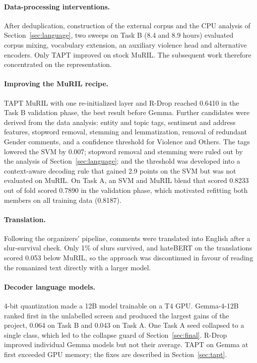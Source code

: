 \documentclass[11pt]{article}
\newcommand{\taska}{Task A}
\newcommand{\taskb}{Task B}
\begin{document}
\paragraph{Data-processing interventions.} After deduplication, construction of
the external corpus and the CPU analysis of Section~\ref{sec:language}, two
sweeps on \taskb{} (8.4 and 8.9 hours) evaluated corpus mixing, vocabulary
extension, an auxiliary violence head and alternative encoders. Only TAPT
improved on stock MuRIL. The subsequent work therefore concentrated on the
representation.

\paragraph{Improving the MuRIL recipe.} TAPT MuRIL with one re-initialized layer
and R-Drop reached 0.6410 in the \taskb{} validation phase, the best result
before Gemma. Further candidates were derived from the data analysis: entity
and topic tags, sentiment and address features, stopword removal, stemming and
lemmatization, removal of redundant Gender comments, and a confidence threshold
for Violence and Others. The tags lowered the SVM by 0.007; stopword removal
and stemming were ruled out by the analysis of Section~\ref{sec:language}; and
the threshold was developed into a context-aware decoding rule that gained 2.9
points on the SVM but was not evaluated on MuRIL. On \taska{}, an SVM and MuRIL
blend that scored 0.8233 out of fold scored 0.7890 in the validation phase,
which motivated refitting both members on all training data (0.8187).

\paragraph{Translation.} Following the organizers' pipeline, comments were
translated into English after a slur-survival check. Only 1\% of slurs
survived, and hateBERT on the translations scored 0.053 below MuRIL, so the
approach was discontinued in favour of reading the romanized text directly with
a larger model.

\paragraph{Decoder language models.} 4-bit quantization made a 12B model
trainable on a T4 GPU. Gemma-4-12B ranked first in the unlabelled screen and
produced the largest gains of the project, 0.064 on \taskb{} and 0.043 on
\taska{}. One \taska{} seed collapsed to a single class, which led to the
collapse guard of Section~\ref{sec:final}. R-Drop improved individual Gemma
models but not their average. TAPT on Gemma at first exceeded GPU memory; the
fixes are described in Section~\ref{sec:tapt}.
\end{document}
